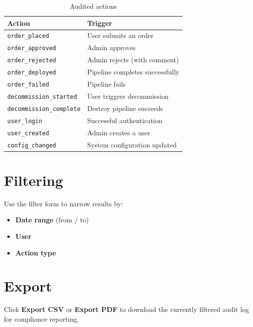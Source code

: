 \documentclass[12pt,a4paper,twoside]{report}
\newcommand{\code}[1]{\texttt{#1}}
\begin{document}
\begin{table}[H]
  \centering
  \caption{Audited actions}
  \begin{tabular}{@{}ll@{}}
    \toprule
    \textbf{Action} & \textbf{Trigger} \\
    \midrule
    \code{order\_placed}      & User submits an order \\
    \code{order\_approved}    & Admin approves \\
    \code{order\_rejected}    & Admin rejects (with comment) \\
    \code{order\_deployed}    & Pipeline completes successfully \\
    \code{order\_failed}      & Pipeline fails \\
    \code{decommission\_started}  & User triggers decommission \\
    \code{decommission\_complete} & Destroy pipeline succeeds \\
    \code{user\_login}        & Successful authentication \\
    \code{user\_created}      & Admin creates a user \\
    \code{config\_changed}    & System configuration updated \\
    \bottomrule
  \end{tabular}
\end{table}

\section{Filtering}

Use the filter form to narrow results by:
\begin{itemize}
  \item \textbf{Date range} (from / to)
  \item \textbf{User}
  \item \textbf{Action type}
\end{itemize}

\section{Export}

Click \textbf{Export CSV} or \textbf{Export PDF} to download the
currently filtered audit log for compliance reporting.

\end{document}
